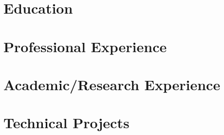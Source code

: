 \documentclass{resume}
\begin{document}


\section{Education}



\section{Professional Experience}



\section{Academic/Research Experience}



\section{Technical Projects}


\end{document}
